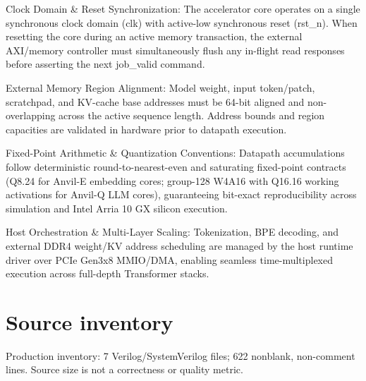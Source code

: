 \documentclass[11pt,a4paper]{article}
\begin{document}
Clock Domain \& Reset Synchronization: The accelerator core operates on a single synchronous clock domain (\allowbreak{}clk)\allowbreak{} with active-low synchronous reset (\allowbreak{}rst\_\allowbreak{}n)\allowbreak{}. When resetting the core during an active memory transaction,\allowbreak{} the external AXI/\allowbreak{}memory controller must simultaneously flush any in-flight read responses before asserting the next job\_\allowbreak{}valid command.


External Memory Region Alignment: Model weight,\allowbreak{} input token/\allowbreak{}patch,\allowbreak{} scratchpad,\allowbreak{} and KV-cache base addresses must be 64-bit aligned and non-overlapping across the active sequence length. Address bounds and region capacities are validated in hardware prior to datapath execution.


Fixed-Point Arithmetic \& Quantization Conventions: Datapath accumulations follow deterministic round-to-nearest-even and saturating fixed-point contracts (\allowbreak{}Q8.24 for Anvil-E embedding cores; group-128 W4A16 with Q16.16 working activations for Anvil-Q LLM cores)\allowbreak{},\allowbreak{} guaranteeing bit-exact reproducibility across simulation and Intel Arria 10 GX silicon execution.


Host Orchestration \& Multi-Layer Scaling: Tokenization,\allowbreak{} BPE decoding,\allowbreak{} and external DDR4 weight/\allowbreak{}KV address scheduling are managed by the host runtime driver over PCIe Gen3x8 MMIO/\allowbreak{}DMA,\allowbreak{} enabling seamless time-multiplexed execution across full-depth Transformer stacks.


\appendix{}\section{Source inventory}

Production inventory: 7 Verilog/\allowbreak{}SystemVerilog files; 622 nonblank,\allowbreak{} non-comment lines. Source size is not a correctness or quality metric.
\end{document}
